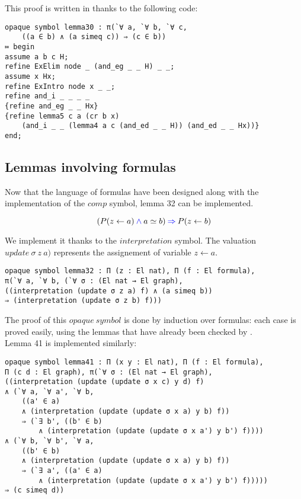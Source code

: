 \documentclass[a4paper]{article}
\begin{document}
This proof is written in \dedukti thanks to the following code: 

\begin{lstlisting}
opaque symbol lemma30 : π(`∀ a, `∀ b, `∀ c, 
	((a ∈ b) ∧ (a simeq c)) ⇒ (c ∈ b))
≔ begin
assume a b c H;
refine ExElim node _ (and_eg _ _ H) _ _;
assume x Hx;
refine ExIntro node x _ _;
refine and_i _ _ _ _
{refine and_eg _ _ Hx}
{refine lemma5 c a (cr b x) 
	(and_i _ _ (lemma4 a c (and_ed _ _ H)) (and_ed _ _ Hx))}
end;
\end{lstlisting}

\subsection{Lemmas involving formulas}

Now that the language of formulas have been designed along with the implementation of the $comp$ symbol, lemma 32 can be implemented.

$$(P(z \leftarrow a) \mathbin{\color{blue} \wedge} a \simeq b) \mathbin{\color{blue} \Rightarrow} P(z \leftarrow b)$$

We implement it thanks to the $interpretation$ symbol. The valuation $update~\sigma~z~a)$ represents the assignement of variable $z \leftarrow a$.

\begin{lstlisting}
opaque symbol lemma32 : Π (z : El nat), Π (f : El formula), 
π(`∀ a, `∀ b, (`∀ σ : (El nat → El graph),
((interpretation (update σ z a) f) ∧ (a simeq b)) 
⇒ (interpretation (update σ z b) f)))
\end{lstlisting}

The proof of this $opaque~symbol$ is done by induction over formulas: each case is proved easily, using the lemmas that have already been checked by \dedukti. \\

Lemma 41 is implemented similarly:

\begin{lstlisting}
opaque symbol lemma41 : Π (x y : El nat), Π (f : El formula), 
Π (c d : El graph), π(`∀ σ : (El nat → El graph), 
((interpretation (update (update σ x c) y d) f)
∧ (`∀ a, `∀ a', `∀ b, 
	((a' ∈ a) 
	∧ (interpretation (update (update σ x a) y b) f)) 
	⇒ (`∃ b', ((b' ∈ b) 
		∧ (interpretation (update (update σ x a') y b') f))))
∧ (`∀ b, `∀ b', `∀ a, 
	((b' ∈ b) 
	∧ (interpretation (update (update σ x a) y b) f)) 
	⇒ (`∃ a', ((a' ∈ a) 
		∧ (interpretation (update (update σ x a') y b') f))))) 
⇒ (c simeq d))
\end{lstlisting}
\end{document}
